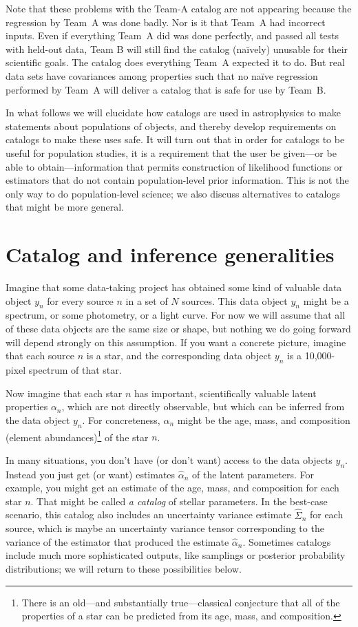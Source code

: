 \documentclass[10pt]{article}
\begin{document}
Note that these problems with the Team-A catalog are not appearing because the regression by Team~A was done badly.
Nor is it that Team~A had incorrect inputs.
Even if everything Team~A did was done perfectly, and passed all tests with held-out data, Team B will still find the catalog (na\"ively) unusable for their scientific goals.
The catalog does everything Team~A expected it to do.
But real data sets have covariances among properties such that no na\"ive regression performed by Team~A will deliver a catalog that is safe for use by Team~B.

In what follows we will elucidate how catalogs are used in astrophysics to make statements about populations of objects, and thereby develop requirements on catalogs to make these uses safe.
It will turn out that in order for catalogs to be useful for population studies, it is a requirement that the user be given---or be able to obtain---information that permits construction of likelihood functions or estimators that do not contain population-level prior information.
This is not the only way to do population-level science; we also discuss alternatives to catalogs that might be more general.

\section{Catalog and inference generalities}

Imagine that some data-taking project has obtained some kind of valuable data object $y_n$ for every source $n$ in a set of $N$ sources.
This data object $y_n$ might be a spectrum, or some photometry, or a light curve.
For now we will assume that all of these data objects are the same size or shape, but nothing we do going forward will depend strongly on this assumption.
If you want a concrete picture, imagine that each source $n$ is a star, and the corresponding data object $y_n$ is a 10,000-pixel spectrum of that star.

Now imagine that each star $n$ has important, scientifically valuable latent properties $\alpha_n$, which are not directly observable, but which can be inferred from the data object $y_n$.
For concreteness, $\alpha_n$ might be the age, mass, and composition (element abundances)\footnote{There is an old---and substantially true---classical conjecture that all of the properties of a star can be predicted from its age, mass, and composition.} of the star $n$.

In many situations, you don't have (or don't want) access to the data objects $y_n$.
Instead you just get (or want) estimates $\hat{\alpha}_n$ of the latent parameters.
For example, you might get an estimate of the age, mass, and composition for each star $n$.
That might be called \emph{a catalog} of stellar parameters.
In the best-case scenario, this catalog also includes an uncertainty variance estimate $\hat{\Sigma}_n$ for each source, which is maybe an uncertainty variance tensor corresponding to the variance of the estimator that produced the estimate $\hat{\alpha}_n$.
Sometimes catalogs include much more sophisticated outputs, like samplings or posterior probability distributions; we will return to these possibilities below.
\end{document}
